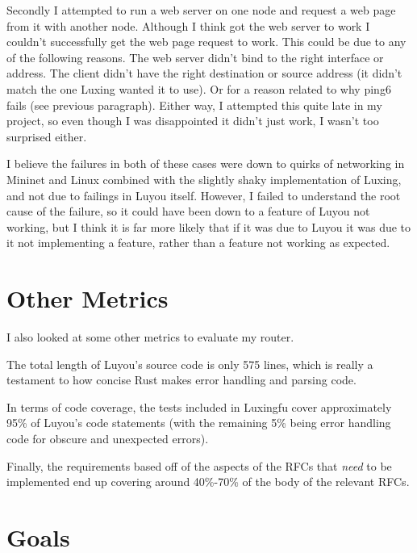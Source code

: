 \documentclass[12pt,a4paper,twoside,openright]{report}
\begin{document}
\bigskip

Secondly I attempted to run a web server on one node and request a web page from it with another node.  Although I think got the web server to work I couldn't successfully get the web page request to work.  This could be due to any of the following reasons.  The web server didn't bind to the right interface or address.  The client didn't have the right destination or source address (it didn't match the one Luxing wanted it to use).  Or for a reason related to why ping6 fails (see previous paragraph).  Either way, I attempted this quite late in my project, so even though I was disappointed it didn't just work, I wasn't too surprised either.

\bigskip

I believe the failures in both of these cases were down to quirks of networking in Mininet and Linux combined with the slightly shaky implementation of Luxing, and not due to failings in Luyou itself. However, I failed to understand the root cause of the failure, so it could have been down to a feature of Luyou not working, but I think it is far more likely that if it was due to Luyou it was due to it not implementing a feature, rather than a feature not working as expected.

\section{Other Metrics}

I also looked at some other metrics to evaluate my router. 

\bigskip

The total length of Luyou's source code is only 575 lines, which is really a testament to how concise Rust makes error handling and parsing code.

\bigskip

In terms of code coverage, the tests included in Luxingfu cover approximately 95\% of Luyou's code statements (with the remaining 5\% being error handling code for obscure and unexpected errors).

\bigskip

Finally, the requirements based off of the aspects of the RFCs that \textit{need} to be implemented end up covering around 40\%-70\% of the body of the relevant RFCs.

\section{Goals}
\end{document}
